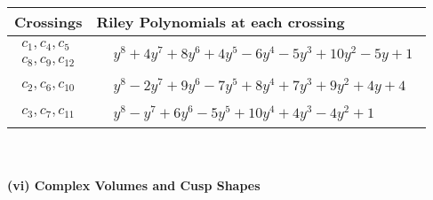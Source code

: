 \documentclass[1p]{elsarticle_modified}
\theoremstyle{definition}
\begin{document}
\begin{tabular}{m{50pt}|m{274pt}}
Crossings & \hspace{64pt}Riley Polynomials at each crossing \\
\hline $$\begin{aligned}c_{1},c_{4},c_{5}\\c_{8},c_{9},c_{12}\end{aligned}$$&$\begin{aligned}
&y^8+4 y^7+8 y^6+4 y^5-6 y^4-5 y^3+10 y^2-5 y+1
\end{aligned}$\\
\hline $$\begin{aligned}c_{2},c_{6},c_{10}\end{aligned}$$&$\begin{aligned}
&y^8-2 y^7+9 y^6-7 y^5+8 y^4+7 y^3+9 y^2+4 y+4
\end{aligned}$\\
\hline $$\begin{aligned}c_{3},c_{7},c_{11}\end{aligned}$$&$\begin{aligned}
&y^8- y^7+6 y^6-5 y^5+10 y^4+4 y^3-4 y^2+1
\end{aligned}$\\
\hline
\end{tabular}\\~\\
\newpage\flushleft \textbf{(vi) Complex Volumes and Cusp Shapes}
\end{document}
